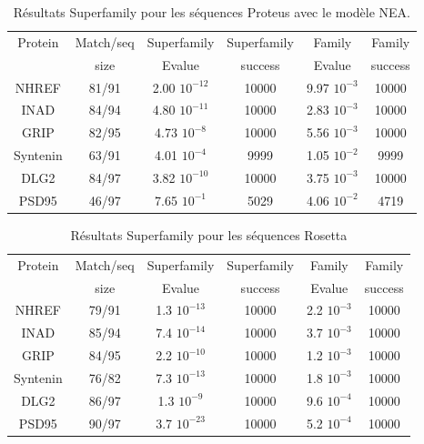 \begin{table}[h]
  
  \begin{tabular}{cccccc}
    
    \toprule
    Protein & Match/seq & Superfamily & Superfamily & Family & Family \\
            & size      & Evalue      & success     & Evalue & success\\
    \cmidrule{1-6}
    NHREF  & 81/91 &     2.00 $10^{-12}$ & 10000  & 9.97 $10^{-3}$ & 10000  \\
    INAD  & 84/94 &      4.80 $10^{-11}$ & 10000  & 2.83 $10^{-3}$ & 10000  \\
    GRIP  & 82/95 &      4.73 $10^{-8}$  & 10000  & 5.56 $10^{-3}$ & 10000  \\
    Syntenin  & 63/91 &  4.01 $10^{-4}$  &  9999  & 1.05 $10^{-2}$ &  9999  \\
    DLG2  & 84/97 &      3.82 $10^{-10}$ & 10000  & 3.75 $10^{-3}$ & 10000  \\
    PSD95  & 46/97 &     7.65 $10^{-1}$  &  5029  & 4.06 $10^{-2}$ &  4719  \\

    \bottomrule        
  \end{tabular}   
  \caption{Résultats Superfamily pour les séquences Proteus avec le modèle NEA.}   
  \label{tab:superfamily_model_B6}       
\end{table}

\begin{table}[h]

  \begin{tabular}{cccccc}
    
    \toprule
    Protein & Match/seq & Superfamily & Superfamily & Family & Family \\
            & size      & Evalue      & success     & Evalue & success\\
    \cmidrule{1-6}
    NHREF    & 79/91   &    1.3 $10^{-13}$ & 10000 & 2.2 $10^{-3}$ & 10000 \\
    INAD     & 85/94   &    7.4 $10^{-14}$ & 10000 & 3.7 $10^{-3}$ & 10000 \\
    GRIP     & 84/95   &    2.2 $10^{-10}$ & 10000 & 1.2 $10^{-3}$ & 10000 \\
    Syntenin & 76/82   &    7.3 $10^{-13}$ & 10000 & 1.8 $10^{-3}$ & 10000 \\
    DLG2     & 86/97   &    1.3 $10^{-9}$  & 10000 & 9.6 $10^{-4}$ & 10000 \\
    PSD95    & 90/97   &    3.7 $10^{-23}$ & 10000 & 5.2 $10^{-4}$ & 10000 \\
    \bottomrule        
  \end{tabular}   
  \caption{Résultats Superfamily pour les séquences Rosetta}   
  \label{tab:superfamily_bestRE}       
\end{table}



